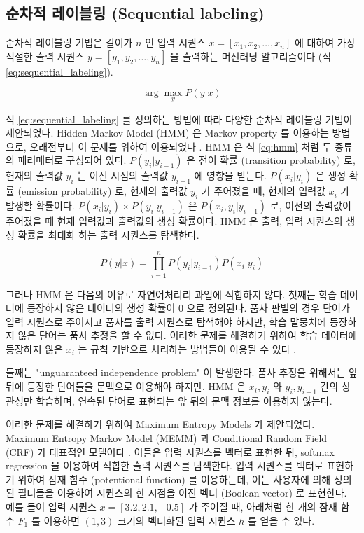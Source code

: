 \documentclass[11pt]{article}
\begin{document}
\subsection{순차적 레이블링 (Sequential labeling)}

순차적 레이블링 기법은 길이가 $n$ 인 입력 시퀀스 $x = [x_1, x_2, \dots, x_n]$ 에 대하여 가장 적절한 출력 시퀀스 $y = [y_1, y_2, \dots, y_n]$ 을 출력하는 머신러닝 알고리즘이다 (식 \ref{eq:sequential_labeling}).

\begin{equation}
  \label{eq:sequential_labeling}
  \arg \max_y P(y \vert x)
\end{equation}

식 \ref{eq:sequential_labeling} 를 정의하는 방법에 따라 다양한 순차적 레이블링 기법이 제안되었다.
Hidden Markov Model (HMM) 은 Markov property 를 이용하는 방법으로, 오래전부터 이 문제를 위하여 이용되었다 \citep{krogh1994hidden}.
HMM 은 식 \ref{eq:hmm} 처럼 두 종류의 패러매터로 구성되어 있다.
$P(y_i \vert y_{i-1})$ 은 전이 확률 (transition probability) 로, 현재의 출력값 $y_i$ 는 이전 시점의 출력값 $y_{i-1}$ 에 영향을 받는다.
$P(x_i \vert y_i)$ 은 생성 확률 (emission probability) 로, 현재의 출력값 $y_i$ 가 주어졌을 때, 현재의 입력값 $x_i$ 가 발생할 확률이다.
$P(x_i \vert y_i) \times P(y_i \vert y_{i-1})$ 은 $P(x_i, y_i \vert y_{i-1})$ 로, 이전의 출력값이 주어졌을 때 현재 입력값과 출력값의 생성 확률이다.
HMM 은 출력, 입력 시퀀스의 생성 확률을 최대화 하는 출력 시퀀스를 탐색한다.

\begin{equation}
  \label{eq:hmm}
  P(y \vert x) = \prod_{i=1}^{n} P(y_i \vert y_{i-1}) P(x_i \vert y_i)
\end{equation}

그러나 HMM 은 다음의 이유로 자연어처리리 과업에 적합하지 않다.
첫째는 학습 데이터에 등장하지 않은 데이터의 생성 확률이 0 으로 정의된다.
품사 판별의 경우 단어가 입력 시퀀스로 주어지고 품사를 출력 시퀀스로 탐색해야 하지만, 학습 말뭉치에 등장하지 않은 단어는 품사 추정을 할 수 없다.
이러한 문제를 해결하기 위하여 학습 데이터에 등장하지 않은 $x_i$ 는 규칙 기반으로 처리하는 방법들이 이용될 수 있다 \citep{brants2000tnt}.

둘째는 "unguaranteed independence problem" 이 발생한다.
품사 추정을 위해서는 앞 뒤에 등장한 단어들을 문맥으로 이용해야 하지만, HMM 은 $x_i, y_i$ 와 $y_i, y_{i-1}$ 간의 상관성만 학습하며, 연속된 단어로 표현되는 앞 뒤의 문맥 정보를 이용하지 않는다.

이러한 문제를 해결하기 위하여 Maximum Entropy Models 가 제안되었다.
Maximum Entropy Markov Model (MEMM) 과 Conditional Random Field (CRF) 가 대표적인 모델이다 \citep{mccallum2000maximum, lafferty2001conditional}.
이들은 입력 시퀀스를 벡터로 표현한 뒤, softmax regression 을 이용하여 적합한 출력 시퀀스를 탐색한다.
입력 시퀀스를 벡터로 표현하기 위하여 잠재 함수 (potentional function) 를 이용하는데, 이는 사용자에 의해 정의된 필터들을 이용하여 시퀀스의 한 시점을 이진 벡터 (Boolean vector) 로 표현한다.
예를 들어 입력 시퀀스 $x=[3.2, 2.1, -0.5]$ 가 주어질 때, 아래처럼 한 개의 잠재 함수 $F_1$ 를 이용하면 $(1, 3)$ 크기의 벡터화된 입력 시퀀스 $h$ 를 얻을 수 있다.
\end{document}
